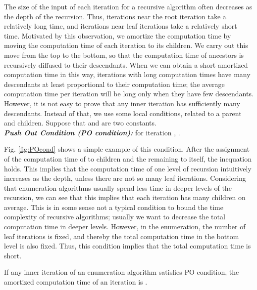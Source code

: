 \documentclass{llncs}
\begin{document}
The size of the input of each iteration for a recursive algorithm often
 decreases as the depth of the recursion. 
Thus, iterations near the root iteration take a relatively long
 time, and iterations near leaf iterations take a relatively short time.
Motivated by this observation, we amortize the computation time by 
 moving the computation time of each iteration to its children.
We carry out this move from the top to the bottom, so that the computation
 time of ancestors is recursively diffused to their descendants.
When we can obtain a short amortized computation time in this way, iterations
 with long computation times have many descendants at least proportional
 to their computation time; the average computation time per iteration
 will be long only when they have few descendants.
However, it is not easy to prove that any inner iteration has sufficiently
 many descendants.
Instead of that, we use some local conditions, related to a parent and
 children.
Suppose that  and  are two constants.\\

\vspace{-1mm}
\noindent 
{\bf \em Push Out Condition (PO condition):} for iteration ,
.\\
\vspace{-1mm}

\noindent
Fig. \ref{fig:POcond} shows a simple example of this condition.
After the assignment of the computation time of 
 to children and the remaining to itself, the inequation
  holds.
This implies that the computation time of one level of
 recursion intuitively increases as the depth, unless there are not so many
  leaf iterations.
Considering that enumeration algorithms usually spend less time in deeper 
 levels of the recursion, we can see that this implies that each iteration
  has many children on average.
This is in some sense not a typical condition to bound the time complexity 
 of recursive algorithms; usually we want to decrease the total computation
 time in deeper levels.
However, in the enumeration, the number of leaf iterations is fixed, and 
 thereby the total computation time in the bottom level is also fixed.
Thus, this condition implies that the total computation time is short.

\begin{theorem}\label{poa}
If any inner iteration of an enumeration algorithm satisfies PO condition,
 the amortized computation time of an iteration is .
\end{theorem}
\vspace{-3mm}
\end{document}
